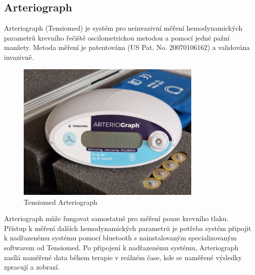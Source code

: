 \subsection{Arteriograph}
Arteriograph (Tensiomed) je systém pro neinvazivní měření hemodynamických parametrů krevního řečiště oscilometrickou metodou a pomocí jedné pažní manžety.
Metoda měření je patentována (US Pat. No. 20070106162) a validována invazivně.
\begin{figure}[H]
    \caption{Tensiomed Arteriograph \cite{cite:Arteriograph}}
    \includegraphics[width=0.8\textwidth]{pictures/arteriograph.jpg}
\end{figure}
Arteriograph může fungovat samostatně pro měření pouze krevního tlaku. Přístup k měření dalších hemodynamických parametrů je potřeba systém připojit k nadřazenému systému pomocí bluetooth s nainstalovaným specializovaným softwarem od Tensiomed.
Po připojení k nadřazenému systému, Arteriograph zasílá naměřené data během terapie v reálném čase, kde se naměřené výsledky zpracují a zobrazí.
\cite{cite:Arteriograph}

